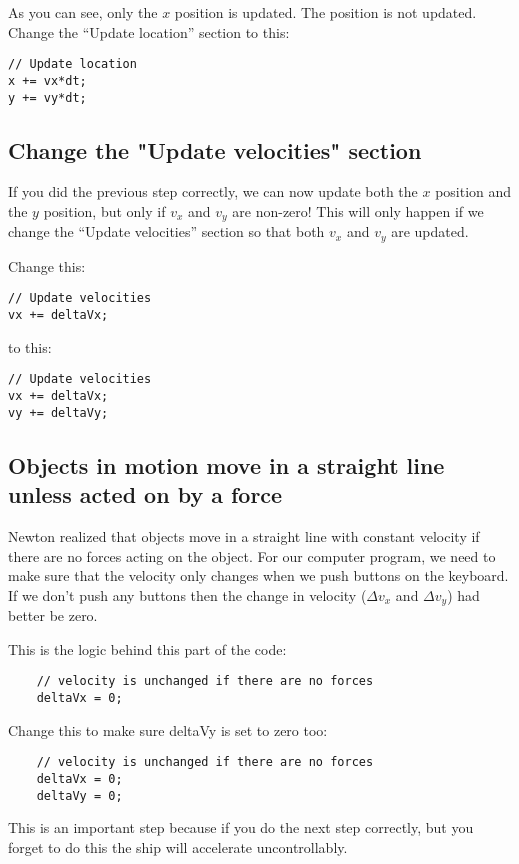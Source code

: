 \documentclass{ximera}
\begin{document}
As you can see, only the $x$ position is updated. The position is not
updated. Change the ``Update location'' section to this:

\begin{verbatim}
// Update location
x += vx*dt;
y += vy*dt;
\end{verbatim}

\subsection{Change the "Update velocities" section}

If you did the previous step correctly, we can now update both the $x$
position and the $y$ position, but only if $v_x$ and $v_y$ are
non-zero! This will only happen if we change the ``Update velocities''
section so that both $v_x$ and $v_y$ are updated.

Change this:

\begin{verbatim}
// Update velocities
vx += deltaVx;
\end{verbatim}

to this:
\begin{verbatim}
// Update velocities
vx += deltaVx;
vy += deltaVy;
\end{verbatim}

\subsection{Objects in motion move in a straight line unless acted on by a force}

Newton realized that objects move in a straight line with constant
velocity if there are no forces acting on the object. For our computer
program, we need to make sure that the velocity only changes when we
push buttons on the keyboard. If we don't push any buttons then the
change in velocity ($\Delta v_x$ and $\Delta v_y$) had better be zero.

This is the logic behind this part of the code:
\begin{verbatim}
    // velocity is unchanged if there are no forces
    deltaVx = 0;
\end{verbatim}
Change this to make sure deltaVy is set to zero too:
\begin{verbatim}
    // velocity is unchanged if there are no forces
    deltaVx = 0;
    deltaVy = 0;
\end{verbatim}

This is an important step because if you do the next step correctly, but you forget to do this the ship will accelerate uncontrollably.
\end{document}
